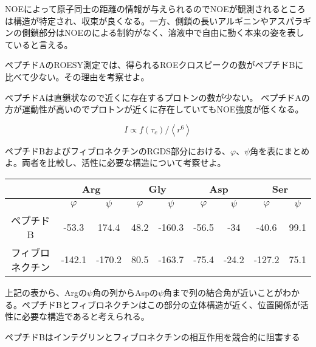 \documentclass[a4paper,papersize,dvipdfmx]{jsarticle}
\begin{document}
NOEによって原子同士の距離の情報が与えられるのでNOEが観測されるところは構造が特定され、収束が良くなる。一方、側鎖の長いアルギニンやアスパラギンの側鎖部分はNOEのによる制約がなく、溶液中で自由に動く本来の姿を表していると言える。


\begin{tcolorbox}[colback=white,colbacktitle=black!10!white,coltitle=black,title={2}]
ペプチドAのROESY測定では、得られるROEクロスピークの数がペプチドBに比べて少ない。その理由を考察せよ。
\end{tcolorbox}

ペプチドAは直鎖状なので近くに存在するプロトンの数が少ない。
ペプチドAの方が運動性が高いのでプロトンが近くに存在していてもNOE強度が低くなる。

\[I   \propto f(\tau _c )/ \left<r^6\right>\]

\begin{tcolorbox}[colback=white,colbacktitle=black!10!white,coltitle=black,title={3}]
ペプチドBおよびフィブロネクチンのRGDS部分における、$\varphi$、$\psi$角を表にまとめよ。両者を比較し、活性に必要な構造について考察せよ。
\end{tcolorbox}

\begin{table}[H]
\begin{center}
\begin{tabular}{|c|c|c|c|c|c|c|c|c|}
\hline
& \multicolumn{2}{c|}{Arg} & \multicolumn{2}{c|}{Gly} & \multicolumn{2}{c|}{Asp} & \multicolumn{2}{c|}{Ser} \\ \hline
& $\varphi$           & $\psi$         &  $\varphi$          & $\psi$           &  $\varphi$           & $\psi$          &  $\varphi$            & $\psi$         \\ \hline
ペプチドB    & -53.3       & 174.4      & 48.2       & -160.3      & -56.5       & -34        & -40.6        & 99.1      \\ \hline
フィブロネクチン & -142.1      & -170.2     & 80.5       & -163.7      & -75.4       & -24.2      & -127.2       & 75.1      \\ \hline
\end{tabular}
\end{center}
\end{table}

上記の表から、Argの$\psi$角の列からAspの$\psi$角まで列の結合角が近いことがわかる。ペプチドBとフィブロネクチンはこの部分の立体構造が近く、位置関係が活性に必要な構造であると考えられる。


ペプチドBはインテグリンとフィブロネクチンの相互作用を競合的に阻害する
\end{document}
